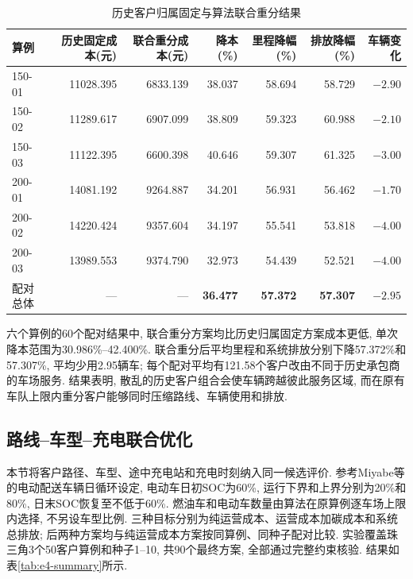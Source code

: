 \documentclass{setp-new}
\newcommand{\setptabsetup}{\fontsize{9pt}{10.5pt}\selectfont\renewcommand{\arraystretch}{0.95}\setlength{\tabcolsep}{2.2pt}\setlength{\aboverulesep}{0.4pt}\setlength{\belowrulesep}{0.4pt}\hbadness=10000}
\begin{document}
\begin{table}[H]
\centering
\caption{历史客户归属固定与算法联合重分结果}
\label{tab:e3-summary}
\setptabsetup
\begin{tabular*}{\linewidth}{@{\extracolsep{\fill}}lrrrrrr@{}}
\toprule
算例 & 历史固定成本(元) & 联合重分成本(元) & 降本(\%) & 里程降幅(\%) & 排放降幅(\%) & 车辆变化\\
\midrule
150-01 & 11028.395 & 6833.139 & 38.037 & 58.694 & 58.729 & $-2.90$ \\
150-02 & 11289.617 & 6907.099 & 38.809 & 59.323 & 60.988 & $-2.10$ \\
150-03 & 11122.395 & 6600.398 & 40.646 & 59.307 & 61.325 & $-3.00$ \\
200-01 & 14081.192 & 9264.887 & 34.201 & 56.931 & 56.462 & $-1.70$ \\
200-02 & 14220.424 & 9357.604 & 34.197 & 55.541 & 53.818 & $-4.00$ \\
200-03 & 13989.553 & 9374.790 & 32.973 & 54.439 & 52.521 & $-4.00$ \\
\midrule
配对总体 & --- & --- & \textbf{36.477} & \textbf{57.372} & \textbf{57.307} & $\mathbf{-2.95}$\\
\bottomrule
\end{tabular*}
\end{table}

六个算例的60个配对结果中, 联合重分方案均比历史归属固定方案成本更低,
单次降本范围为30.986\%--42.400\%.
联合重分后平均里程和系统排放分别下降57.372\%和57.307\%, 平均少用2.95辆车;
每个配对平均有121.58个客户改由不同于历史承包商的车场服务.
结果表明, 散乱的历史客户组合会使车辆跨越彼此服务区域,
而在原有车队上限内重分客户能够同时压缩路线、车辆使用和排放.

\subsection{路线--车型--充电联合优化}

本节将客户路径、车型、途中充电站和充电时刻纳入同一候选评价.
参考Miyabe等\cite{ref:90}的电动配送车辆日循环设定,
电动车日初SOC为60\%, 运行下界和上界分别为20\%和80\%, 日末SOC恢复至不低于60\%.
燃油车和电动车数量由算法在原算例逐车场上限内选择, 不另设车型比例.
三种目标分别为纯运营成本、运营成本加碳成本和系统总排放;
后两种方案均与纯运营成本方案按同算例、同种子配对比较.
实验覆盖珠三角3个50客户算例和种子1--10, 共90个最终方案, 全部通过完整约束核验.
结果如表\ref{tab:e4-summary}所示.
\end{document}
